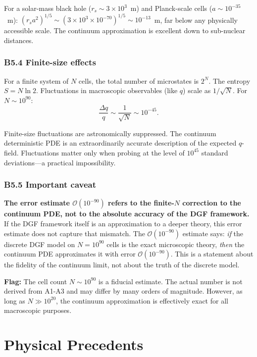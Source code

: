 \documentclass[reprint]{revtex4-2}
\begin{document}
For a solar-mass black hole ($r_s \sim 3\times 10^3$~m) and Planck-scale cells ($a \sim 10^{-35}$~m): $(r_s a^2)^{1/5} \sim (3\times 10^3 \times 10^{-70})^{1/5} \sim 10^{-13}$~m, far below any physically accessible scale. The continuum approximation is excellent down to sub-nuclear distances.

\subsubsection{B5.4 Finite-size effects}

For a finite system of $N$ cells, the total number of microstates is $2^N$. The entropy $S = N\ln 2$. Fluctuations in macroscopic observables (like $q$) scale as $1/\sqrt{N}$. For $N\sim 10^{90}$:
\begin{equation}
\frac{\Delta q}{q} \sim \frac{1}{\sqrt{N}} \sim 10^{-45}.
\end{equation}

Finite-size fluctuations are astronomically suppressed. The continuum deterministic PDE is an extraordinarily accurate description of the expected $q$-field. Fluctuations matter only when probing at the level of $10^{45}$ standard deviations---a practical impossibility.

\subsubsection{B5.5 Important caveat}

\textbf{The error estimate $\mathcal{O}(10^{-90})$ refers to the finite-$N$ correction to the continuum PDE, not to the absolute accuracy of the DGF framework.} If the DGF framework itself is an approximation to a deeper theory, this error estimate does not capture that mismatch. The $\mathcal{O}(10^{-90})$ estimate says: \emph{if} the discrete DGF model on $N=10^{90}$ cells is the exact microscopic theory, \emph{then} the continuum PDE approximates it with error $\mathcal{O}(10^{-90})$. This is a statement about the fidelity of the continuum limit, not about the truth of the discrete model.

\textbf{Flag:} The cell count $N\sim 10^{90}$ is a fiducial estimate. The actual number is not derived from A1-A3 and may differ by many orders of magnitude. However, as long as $N \gg 10^{20}$, the continuum approximation is effectively exact for all macroscopic purposes.

\section{Physical Precedents}
\end{document}
